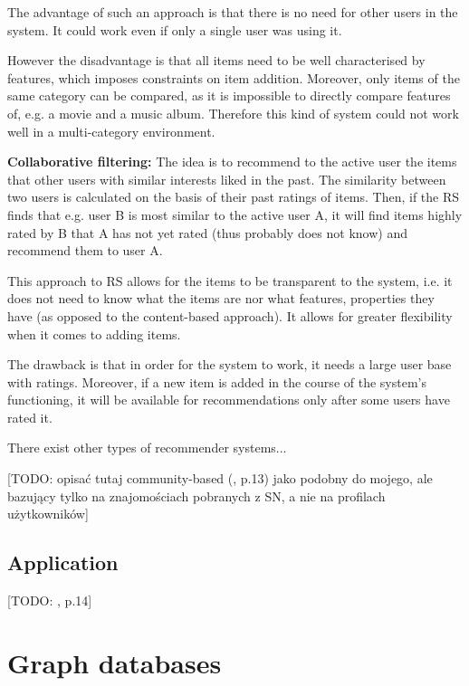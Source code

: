 \documentclass[12pt]{report}
\begin{document}
The advantage of such an approach is that there is no need for other users in the system. It could work even if only a single user was using it.

However the disadvantage is that all items need to be well characterised by features, which imposes constraints on item addition. Moreover, only items of the same category can be compared, as it is impossible to directly compare features of, e.g. a movie and a music album. Therefore this kind of system could not work well in a multi-category environment.

\hbox{}
{\bf Collaborative filtering:} The idea is to recommend to the active user the items that other users with similar interests liked in the past. The similarity between two users is calculated on the basis of their past ratings of items. Then, if the RS finds that e.g. user B is most similar to the active user A, it will find items highly rated by B that A has not yet rated (thus probably does not know) and recommend them to user A.

This approach to RS allows for the items to be transparent to the system, i.e. it does not need to know what the items are nor what features, properties they have (as opposed to the content-based approach). It allows for greater flexibility when it comes to adding items.

The drawback is that in order for the system to work, it needs a large user base with ratings. Moreover, if a new item is added in the course of the system's functioning, it will be available for recommendations only after some users have rated it.

\hbox{}
There exist other types of recommender systems...

[TODO: opisać tutaj community-based (\cite{rec_sys_handbook}, p.13) jako podobny do mojego, ale bazujący tylko na znajomościach pobranych z SN, a nie na profilach użytkowników]

\subsection{Application}
[TODO: \cite{rec_sys_handbook}, p.14]

\section{Graph databases}
\end{document}
